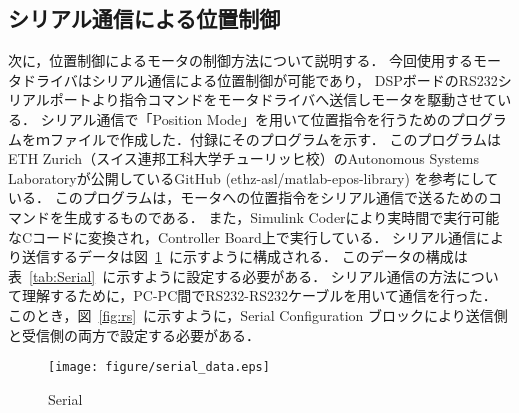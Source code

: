 \documentclass[a4paper,12pt]{article_vdlab_sotsuron}
\begin{document}
\newpage
\subsection{シリアル通信による位置制御}
次に，位置制御によるモータの制御方法について説明する．
今回使用するモータドライバはシリアル通信による位置制御が可能であり，
DSPボードのRS232シリアルポートより指令コマンドをモータドライバへ送信しモータを駆動させている．
シリアル通信で「Position Mode」を用いて位置指令を行うためのプログラムをｍファイルで作成した．付録にそのプログラムを示す．
このプログラムはETH Zurich（スイス連邦工科大学チューリッヒ校）のAutonomous Systems Laboratoryが公開しているGitHub (ethz-asl/matlab-epos-library)
を参考にしている\cite{GitHub}．
このプログラムは，モータへの位置指令をシリアル通信で送るためのコマンドを生成するものである．
また，Simulink Coderにより実時間で実行可能なCコードに変換され，Controller Board上で実行している．
シリアル通信により送信するデータは図~\ref{fig:serial1}~に示すように構成される．
このデータの構成は表~\ref{tab:Serial}~に示すように設定する必要がある．
シリアル通信の方法について理解するために，PC-PC間でRS232-RS232ケーブルを用いて通信を行った．
このとき，図~\ref{fig:rs}~に示すように，Serial Configuration ブロックにより送信側と受信側の両方で設定する必要がある．

\vspace{10mm}
\begin{figure}[h]
  \begin{center}
    \texttt{[image: figure/serial\_data.eps]}
    \vspace{3mm}
    \caption{Serial}
    \label{fig:serial1}
  \end{center}
\end{figure}
\end{document}
